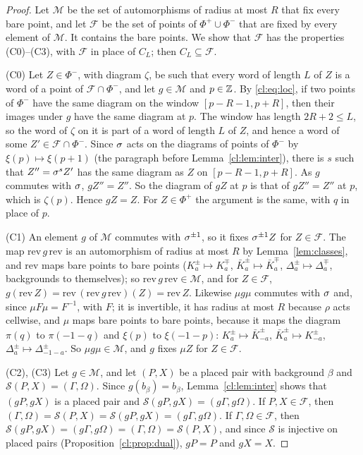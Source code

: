 \begin{proof}
Let $\mathcal M$ be the set of automorphisms of radius at most $R$ that fix every bare point, and let $\mathcal F$ be the set of points of $\Phi^+\cup\Phi^-$ that are fixed by every element of $\mathcal M$. It contains the bare points. We show that $\mathcal F$ has the properties (C0)--(C3), with $\mathcal F$ in place of $C_L$; then $C_L\subseteq\mathcal F$.

(C0) Let $Z\in\Phi^-$, with diagram $\zeta$, be such that every word of length $L$ of $Z$ is a word of a point of $\mathcal F\cap\Phi^-$, and let $g\in\mathcal M$ and $p\in\mathbb{Z}$. By \eqref{cl:eq:loc}, if two points of $\Phi^-$ have the same diagram on the window $[p-R-1,p+R]$, then their images under $g$ have the same diagram at $p$. The window has length $2R+2\le L$, so the word of $\zeta$ on it is part of a word of length $L$ of $Z$, and hence a word of some $Z'\in\mathcal F\cap\Phi^-$. Since $\sigma$ acts on the diagrams of points of $\Phi^-$ by $\xi(p)\mapsto\xi(p+1)$ (the paragraph before Lemma~\ref{cl:lem:inter}), there is $s$ such that $Z''=\sigma^sZ'$ has the same diagram as $Z$ on $[p-R-1,p+R]$. As $g$ commutes with $\sigma$, $gZ''=Z''$. So the diagram of $gZ$ at $p$ is that of $gZ''=Z''$ at $p$, which is $\zeta(p)$. Hence $gZ=Z$. For $Z\in\Phi^+$ the argument is the same, with $q$ in place of $p$.

(C1) An element $g$ of $\mathcal M$ commutes with $\sigma^{\pm1}$, so it fixes $\sigma^{\pm1}Z$ for $Z\in\mathcal F$. The map $\mathrm{rev}\,g\,\mathrm{rev}$ is an automorphism of radius at most $R$ by Lemma~\ref{lem:classes}, and $\mathrm{rev}$ maps bare points to bare points ($K^\pm_a\mapsto K^\mp_a$, $\bar K^\pm_a\mapsto\bar K^\mp_a$, $\Delta^\pm_a\mapsto\Delta^\mp_a$, backgrounds to themselves); so $\mathrm{rev}\,g\,\mathrm{rev}\in\mathcal M$, and for $Z\in\mathcal F$, $g(\mathrm{rev}\,Z)=\mathrm{rev}\,(\mathrm{rev}\,g\,\mathrm{rev})(Z)=\mathrm{rev}\,Z$. Likewise $\mu g\mu$ commutes with $\sigma$ and, since $\mu F\mu=F^{-1}$, with $F$; it is invertible, it has radius at most $R$ because $\rho$ acts cellwise, and $\mu$ maps bare points to bare points, because it maps the diagram $\pi(q)$ to $\pi(-1-q)$ and $\xi(p)$ to $\xi(-1-p)$: $K^\pm_a\mapsto\bar K^\pm_{-a}$, $\bar K^\pm_a\mapsto K^\pm_{-a}$, $\Delta^\pm_a\mapsto\Delta^\pm_{-1-a}$. So $\mu g\mu\in\mathcal M$, and $g$ fixes $\mu Z$ for $Z\in\mathcal F$.

(C2), (C3) Let $g\in\mathcal M$, and let $(P,X)$ be a placed pair with background $\beta$ and $\mathcal S(P,X)=(\Gamma,\Omega)$. Since $g(b_\beta)=b_\beta$, Lemma~\ref{cl:lem:inter} shows that $(gP,gX)$ is a placed pair and $\mathcal S(gP,gX)=(g\Gamma,g\Omega)$. If $P,X\in\mathcal F$, then $(\Gamma,\Omega)=\mathcal S(P,X)=\mathcal S(gP,gX)=(g\Gamma,g\Omega)$. If $\Gamma,\Omega\in\mathcal F$, then $\mathcal S(gP,gX)=(g\Gamma,g\Omega)=(\Gamma,\Omega)=\mathcal S(P,X)$, and since $\mathcal S$ is injective on placed pairs (Proposition~\ref{cl:prop:dual}), $gP=P$ and $gX=X$.
\end{proof}

